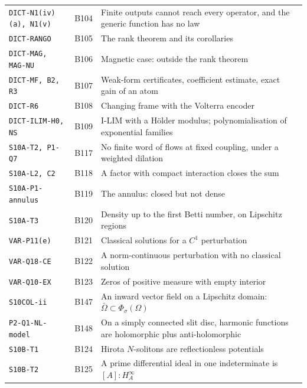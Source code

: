 \documentclass[11pt,a4paper,oneside]{report}
\begin{document}
\begin{center}
\begin{longtable}{@{}L{3.6cm}L{1.2cm}L{8.0cm}L{1.2cm}@{}}
\texttt{DICT-N1(iv)(a), N1(v)} & B104 & Finite outputs cannot reach every operator, and the generic function has no law & \pageref{dim:DICT-N1(iv)(a), N1(v)}\\
\texttt{DICT-RANGO} & B105 & The rank theorem and its corollaries & \pageref{dim:DICT-RANGO}\\
\texttt{DICT-MAG, MAG-NU} & B106 & Magnetic case: outside the rank theorem & \pageref{dim:DICT-MAG, MAG-NU}\\
\texttt{DICT-MF, B2, R3} & B107 & Weak-form certificates, coefficient estimate, exact gain of an atom & \pageref{dim:DICT-MF, B2, R3}\\
\texttt{DICT-R6} & B108 & Changing frame with the Volterra encoder & \pageref{dim:DICT-R6}\\
\texttt{DICT-ILIM-H0, NS} & B109 & I-LIM with a H\"older modulus; polynomialisation of exponential families & \pageref{dim:DICT-ILIM-H0, NS}\\
\texttt{S10A-T2, P1-Q7} & B117 & No finite word of flows at fixed coupling, under a weighted dilation & \pageref{dim:S10A-T2, P1-Q7}\\
\texttt{S10A-L2, C2} & B118 & A factor with compact interaction closes the sum & \pageref{dim:S10A-L2, C2}\\
\texttt{S10A-P1-annulus} & B119 & The annulus: closed but not dense & \pageref{dim:S10A-P1-annulus}\\
\texttt{S10A-T3} & B120 & Density up to the first Betti number, on Lipschitz regions & \pageref{dim:S10A-T3}\\
\texttt{VAR-P11(e)} & B121 & Classical solutions for a $C^1$ perturbation & \pageref{dim:VAR-P11(e)}\\
\texttt{VAR-Q18-CE} & B122 & A norm-continuous perturbation with no classical solution & \pageref{dim:VAR-Q18-CE}\\
\texttt{VAR-Q10-EX} & B123 & Zeros of positive measure with empty interior & \pageref{dim:VAR-Q10-EX}\\
\texttt{S10COL-ii} & B147 & An inward vector field on a Lipschitz domain: $\bar\Omega\subset\Phi_\sigma(\Omega)$ & \pageref{dim:S10COL-ii}\\
\texttt{P2-Q1-NL-model} & B148 & On a simply connected slit disc, harmonic functions are holomorphic plus anti-holomorphic & \pageref{dim:P2-Q1-NL-model}\\
\texttt{S10B-T1} & B124 & Hirota $N$-solitons are reflectionless potentials & \pageref{dim:S10B-T1}\\
\texttt{S10B-T2} & B125 & A prime differential ideal in one indeterminate is $[A]:H_A^\infty$ & \pageref{dim:S10B-T2}\\

\end{longtable}
\end{center}
\end{document}
